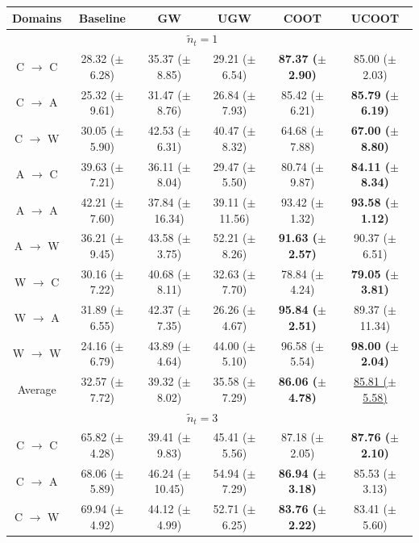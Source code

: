 \begin{table}[t]
  \small
  \centering
  \begin{tabular}{c c c c c c}
    \toprule
    Domains & Baseline & GW & UGW & COOT & UCOOT \\
    \midrule
    & \multicolumn{4}{c}{\large{$\tilde{n}_t = 1$}} \\
    \midrule

    C $\to$ C & 28.32 ($\pm$ 6.28) & 35.37 ($\pm$ 8.85) & 29.21 ($\pm$ 6.54) & \textbf{87.37 ($\pm$ 2.90)} & 85.00 ($\pm$ 2.03) \\
    \hline
    C $\to$ A & 25.32 ($\pm$ 9.61) & 31.47 ($\pm$ 8.76) & 26.84 ($\pm$ 7.93) & 85.42 ($\pm$ 6.21) & \textbf{85.79 ($\pm$ 6.19)} \\
    \hline
    C $\to$ W & 30.05 ($\pm$ 5.90) & 42.53 ($\pm$ 6.31) & 40.47 ($\pm$ 8.32) & 64.68 ($\pm$ 7.88) & \textbf{67.00 ($\pm$ 8.80)} \\
    \hline

    A $\to$ C & 39.63 ($\pm$ 7.21) & 36.11 ($\pm$ 8.04) & 29.47 ($\pm$ 5.50) & 80.74 ($\pm$ 9.87) & \textbf{84.11 ($\pm$ 8.34)} \\
    \hline
    A $\to$ A & 42.21 ($\pm$ 7.60) & 37.84 ($\pm$ 16.34) & 39.11 ($\pm$ 11.56) & 93.42 ($\pm$ 1.32) & \textbf{93.58 ($\pm$ 1.12)} \\
    \hline
    A $\to$ W & 36.21 ($\pm$ 9.45) & 43.58 ($\pm$ 3.75) & 52.21 ($\pm$ 8.26) & \textbf{91.63 ($\pm$ 2.57)} & 90.37 ($\pm$ 6.51) \\
    \hline

    W $\to$ C & 30.16 ($\pm$ 7.22) & 40.68 ($\pm$ 8.11) & 32.63 ($\pm$ 7.70) & 78.84 ($\pm$ 4.24) & \textbf{79.05 ($\pm$ 3.81)} \\
    \hline
    W $\to$ A & 31.89 ($\pm$ 6.55) & 42.37 ($\pm$ 7.35) & 26.26 ($\pm$ 4.67) & \textbf{95.84 ($\pm$ 2.51)} & 89.37 ($\pm$ 11.34) \\
    \hline
    W $\to$ W & 24.16 ($\pm$ 6.79) & 43.89 ($\pm$ 4.64) & 44.00 ($\pm$ 5.10) & 96.58 ($\pm$ 5.54) & \textbf{98.00 ($\pm$ 2.04)} \\
    \midrule
    Average & 32.57 ($\pm$ 7.72) & 39.32 ($\pm$ 8.02) & 35.58 ($\pm$ 7.29) & \textbf{86.06 ($\pm$ 4.78)} & \underline{85.81 ($\pm$ 5.58)} \\

    \midrule
    & \multicolumn{4}{c}{\large{$\tilde{n}_t = 3$}} \\
    \midrule

    C $\to$ C & 65.82 ($\pm$ 4.28) & 39.41 ($\pm$ 9.83) & 45.41 ($\pm$ 5.56) & 87.18 ($\pm$ 2.05) & \textbf{87.76 ($\pm$ 2.10)} \\
    \hline
    C $\to$ A & 68.06 ($\pm$ 5.89) & 46.24 ($\pm$ 10.45) & 54.94 ($\pm$ 7.29) & \textbf{86.94 ($\pm$ 3.18)} & 85.53 ($\pm$ 3.13) \\
    \hline
    C $\to$ W & 69.94 ($\pm$ 4.92) & 44.12 ($\pm$ 4.99) & 52.71 ($\pm$ 6.25) & \textbf{83.76 ($\pm$ 2.22)} & 83.41 ($\pm$ 5.60) \\
    \hline


\end{tabular}
\end{table}
